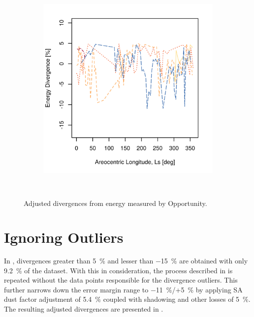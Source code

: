 \begin{figure}[h]
\begin{subfigure}[t]{\subfigureWidth}
            \includegraphics[height=\graphicsHeight]{sections/appendix/energy-error-margin/plots/energy-prediction-divergences-from-my28-to-my32-adjusted-without-outliers.png}
            \label{fig:plot:mer-energy-prediction-divergences-adjusted-without-outliers}
    \end{subfigure}\\[0.8ex]
    \caption[Adjusted divergences from energy measured by Opportunity]
    {Adjusted divergences from energy measured by Opportunity.}
    \label{fig:plot:mer-energy-prediction-divergences-adjusted}
\vspace{-2ex}
\end{figure}



\section{Ignoring Outliers}
\label{sec:Appendix:NarrowedEnergyPredictionErrorMarginRange:IgnoringOutliers}

In , divergences greater than \SI{5}{\percent} and lesser than \SI{-15}{\percent} are obtained with only \SI{9.2}{\percent} of the dataset. With this in consideration, the process described in  is repeated without the data points responsible for the divergence outliers. This further narrows down the error margin range to \SI{-11}{\percent}/+\SI{5}{\percent} by applying \ac{SA} dust factor adjustment of \SI{5.4}{\percent} coupled with shadowing and other losses of \SI{5}{\percent}. The resulting adjusted divergences are presented in .


